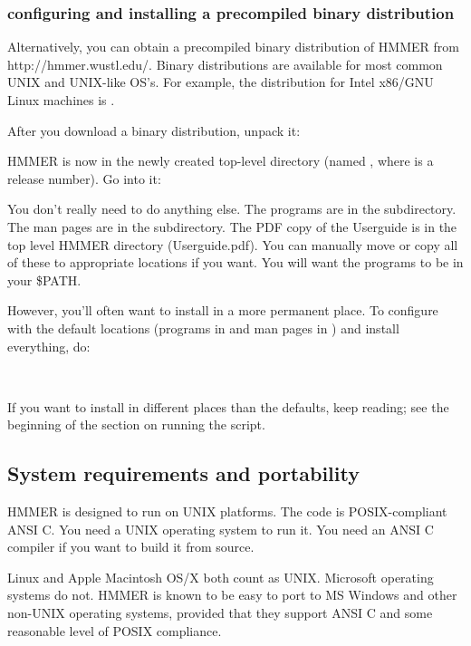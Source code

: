 \subsubsection{configuring and installing a precompiled binary distribution}

Alternatively, you can obtain a precompiled binary distribution of
HMMER from 
{http://hmmer.wustl.edu/}. Binary distributions are available for most
common UNIX and UNIX-like OS's. For example, the distribution for
Intel x86/GNU Linux machines is .

After you download a binary distribution, unpack it:


HMMER is now in the newly created top-level directory (named
, where  is a release number). Go into
it:


You don't really need to do anything else. The programs are in the
 subdirectory. The man pages are in the
 subdirectory.  The PDF copy of the Userguide
is in the top level HMMER directory (Userguide.pdf).  You can manually
move or copy all of these to appropriate locations if you want. You
will want the programs to be in your \$PATH.

However, you'll often want to install in a more permanent place.  To
configure with the default locations (programs in
 and man pages in )
and install everything, do:

\\

If you want to install in different places than the defaults, keep
reading; see the beginning of the section on running the
 script.

\subsection{System requirements and portability}

HMMER is designed to run on UNIX platforms. The code is
POSIX-compliant ANSI C.  You need a UNIX operating system to run it.
You need an ANSI C compiler if you want to build it from source. 

Linux and Apple Macintosh OS/X both count as UNIX. Microsoft operating
systems do not. HMMER is known to be easy to port to MS Windows and
other non-UNIX operating systems, provided that they support ANSI C
and some reasonable level of POSIX compliance.


